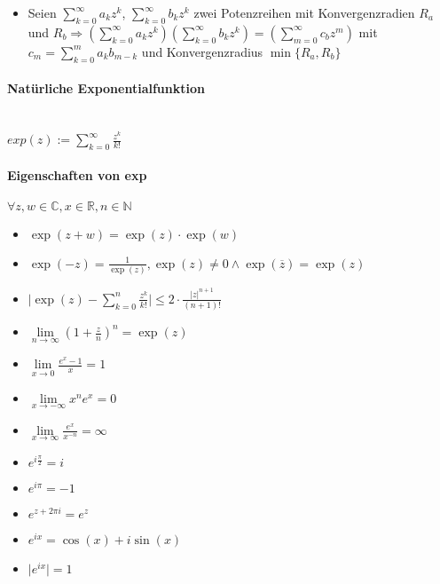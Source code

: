 \documentclass[paper=a3,paper=landscape, fontsize=9pt, DIV=30]{scrartcl}
\newcommand{\real}{{\mathbb{R}}}
\newcommand{\compl}{\mathbb{C}}
\newcommand{\nat}{\mathbb{N}}
\begin{document}
\begin{multicols*}{4}
\begin{itemize}
  \item Seien $ \sum_{k=0}^{\infty} a_kz^k$, $\sum_{k=0}^{\infty} b_kz^k$ zwei Potenzreihen mit Konvergenzradien $R_a$ und $ R_b \Rightarrow (\sum_{k=0}^{\infty} a_kz^k)(\sum_{k=0}^{\infty} b_kz^k)=(\sum_{m=0}^{\infty} c_bz^m)$ mit $ c_m = \sum_{k=0}^{m} a_kb_{m-k}$ und Konvergenzradius $\min\{R_a,R_b\}$
  \end{itemize}


  \paragraph{Natürliche Exponentialfunktion}\hspace{0pt} \\
  $ exp(z) := \sum_{k=0}^{\infty} \frac{z^k}{k!}$%


  \paragraph{Eigenschaften von exp}
  $\forall z,w \in \compl, x \in \real, n \in \nat$
  \begin{itemize}
  \item $\exp(z+w)=\exp(z)\cdot \exp(w)$
  \item $\exp(-z)=\frac{1}{\exp(z)}, \exp(z) \neq 0 \wedge \exp(\overline{z})=\exp(z)$
  \item $\lvert \exp(z)- \sum_{k=0}^{n} \frac{z^k}{k!} \rvert \leq 2 \cdot \frac{\lvert z \rvert ^{n+1}}{(n+1)!}$
  \item $\lim\limits_{n \rightarrow \infty} (1+\frac{z}{n})^n=\exp(z)$
  \item $\lim\limits_{x \rightarrow 0} \frac{e^x-1}{x} = 1$
  \item $\lim\limits_{x \rightarrow -\infty} x^ne^x=0$
  \item $\lim\limits_{x \rightarrow \infty} \frac{e^x}{x^{-n}}=\infty$
  \item $e^{i \frac{\pi}{2}} = i$
  \item $e^{i\pi}=-1$
  \item $e^{z+2\pi i}=e^z$
  \item $e^{ix}=\cos(x)+i\sin(x)$
  \item $\lvert e^{ix} \rvert = 1$
  \end{itemize}


\end{multicols*}
\end{document}
